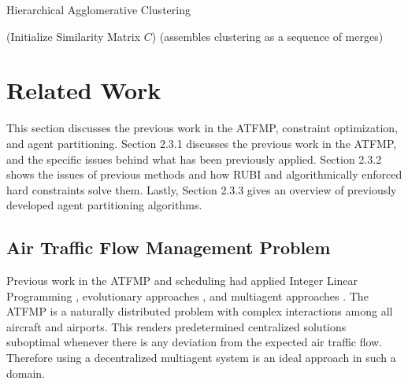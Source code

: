 \documentclass[onehalf,11pt]{beavtex}
\begin{document}
\begin{algorithm}
  \caption{Hierarchical Agglomerative Clustering}
  \begin{algorithmic}[1]
    \Statex
	   \hspace{25 mm} (Initialize Similarity Matrix $C$)
          \EndFor
        \EndFor
         \hspace{20 mm} (assembles clustering as a sequence of merges)
          \EndFor
        \EndFor
      \State {}
    \EndFunction
  \end{algorithmic}
\end{algorithm}

\section{Related Work}

This section discusses the previous work in the ATFMP, constraint optimization, and agent partitioning. Section 2.3.1 discusses the previous work in the ATFMP, and the specific issues behind what has been previously applied. Section 2.3.2 shows the issues of previous methods and how RUBI and algorithmically enforced hard constraints solve them. Lastly, Section 2.3.3 gives an overview of previously developed agent partitioning algorithms.

\subsection{Air Traffic Flow Management Problem}

Previous work in the ATFMP and scheduling had applied Integer Linear Programming \cite{Bertsimas}, evolutionary approaches \cite{Agogino:2009:EEM:1570256.1570258, Rios}, and multiagent approaches \cite{tumer-agogino_jaamas12,Curran:2013:AHC:2484920.2485183, 664154, Sislak:2008:AMA:1402744.1402755, Zhang95areinforcement}. The ATFMP is a naturally distributed problem with complex interactions among all aircraft and airports. This renders predetermined centralized solutions suboptimal whenever there is any deviation from the expected air traffic flow. Therefore using a decentralized multiagent system is an ideal approach in such a domain.
\end{document}
